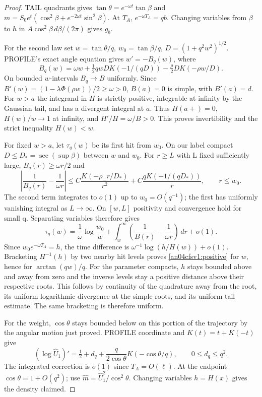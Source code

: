 \documentclass[11pt]{article}
\newcommand{\dd}{\,d}\newcommand{\E}{\mathbb E}
\begin{document}
\begin{proof}
TAIL quadrants gives \(\tan\theta=e^{-\omega t}\tan\beta\) and
\(m=S_0e^t(\cos^2\beta+e^{-2\omega t}\sin^2\beta)\).
At \(T_A\), \(e^{-\omega T_A}=qb\). Changing variables from
\(\beta\) to \(h\) in \(A\cos^2\beta\,d\beta/(2\pi)\) gives \(g_b\).

For the second law set \(w=\tan\theta/q,\ w_0=\tan\beta/q\),
\(D=(1+q^2w^2)^{1/2}\). PROFILE's exact angle equation gives
\(w'=-B_q(w)\), where
\[
 B_q(w)=\omega w+\tfrac12qwD K(-1/(qD))
                     -\tfrac\rho2D K(-\rho w/D).
\]
On bounded \(w\)-intervals \(B_q\to B\) uniformly. Since
\(B'(w)=(1-\lambda\Phi(\rho w))/2\ge\omega>0\),
\(B(a)=0\) is simple, with \(B'(a)=d\). For \(w>a\) the integrand
in \(H\) is strictly positive, integrable at infinity by the Gaussian
tail, and has a divergent integral at \(a\). Thus \(H(a+)=0\),
\(H(w)/w\to1\) at infinity, and
\(H'/H=\omega/B>0\). This proves invertibility and the strict
inequality \(H(w)<w\).

For fixed \(w>a\), let \(\tau_q(w)\) be its first hit from \(w_0\).
On our label compact \(D\le D_*=\sec(\sup\beta)\) between \(w\) and
\(w_0\). For \(r\ge L\) with L fixed sufficiently large,
\(B_q(r)\ge\omega r/2\) and
\[
 \left|\frac1{B_q(r)}-\frac1{\omega r}\right|
 \le C\frac{K(-\rho_-r/D_*)}{r^2}
    +C\frac{qK(-1/(qD_*))}{r},\qquad r\le w_0 .
\]
The second term integrates to \(o(1)\) up to \(w_0=O(q^{-1})\);
the first has uniformly vanishing integral as \(L\to\infty\).
On \([w,L]\) positivity and convergence hold for small q. Separating
variables therefore gives
\[
 \tau_q(w)=\frac1\omega\log\frac{w_0}{w}
       +\int_w^\infty\left(\frac1{B(r)}-\frac1{\omega r}\right)\dd r+o(1).
\]
Since \(w_0e^{-\omega T_A}=h\), the time difference is
\(\omega^{-1}\log(h/H(w))+o(1)\). Bracketing \(H^{-1}(h)\) by two
nearby hit levels proves \eqref{an04cfsv1:positive} for \(w\), hence
for \(\arctan(qw)/q\). For the parameter compacts, \(h\) stays
bounded above and away from zero and the inverse levels stay a positive
distance above their respective roots. This follows by continuity of
the quadrature away from the root, its uniform logarithmic divergence
at the simple roots, and its uniform tail estimate. The same bracketing
is therefore uniform.

For the weight, \(\cos\theta\) stays bounded below on this portion of
the trajectory by the angular motion just proved. PROFILE coordinate
and \(K(t)=t+K(-t)\) give
\[
 (\log\widehat U_1)'=\tfrac12+d_q+
 \frac{q}{2\cos\theta}K(-\cos\theta/q),\qquad 0\le d_q\le q^2 .
\]
The integrated correction is \(o(1)\) since \(T_A=O(\ell)\).
At the endpoint \(\cos\theta=1+O(q^2)\); use
\(\widehat m=\widehat U_1^2/\cos^2\theta\).
Changing variables \(h=H(x)\) gives the density claimed.


\end{proof}
\end{document}
